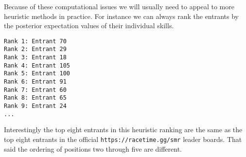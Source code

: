 \documentclass[
  letterpaper,
  DIV=11,
  numbers=noendperiod]{scrartcl}
\newenvironment{Shaded}{\begin{snugshade}}{\end{snugshade}}
\newcommand{\AttributeTok}[1]{\textcolor[rgb]{0.40,0.45,0.13}{#1}}
\newcommand{\ConstantTok}[1]{\textcolor[rgb]{0.56,0.35,0.01}{#1}}
\newcommand{\ControlFlowTok}[1]{\textcolor[rgb]{0.00,0.23,0.31}{#1}}
\newcommand{\DecValTok}[1]{\textcolor[rgb]{0.68,0.00,0.00}{#1}}
\newcommand{\FunctionTok}[1]{\textcolor[rgb]{0.28,0.35,0.67}{#1}}
\newcommand{\NormalTok}[1]{\textcolor[rgb]{0.00,0.23,0.31}{#1}}
\newcommand{\OtherTok}[1]{\textcolor[rgb]{0.00,0.23,0.31}{#1}}
\newcommand{\SpecialCharTok}[1]{\textcolor[rgb]{0.37,0.37,0.37}{#1}}
\newcommand{\StringTok}[1]{\textcolor[rgb]{0.13,0.47,0.30}{#1}}
\begin{document}
Because of these computational issues we will usually need to appeal to
more heuristic methods in practice. For instance we can always rank the
entrants by the posterior expectation values of their individual skills.

\begin{Shaded}
\end{Shaded}

\begin{verbatim}
Rank 1: Entrant 70
Rank 2: Entrant 29
Rank 3: Entrant 18
Rank 4: Entrant 105
Rank 5: Entrant 100
Rank 6: Entrant 91
Rank 7: Entrant 60
Rank 8: Entrant 65
Rank 9: Entrant 24
...
\end{verbatim}

Interestingly the top eight entrants in this heuristic ranking are the
same as the top eight entrants in the official
\texttt{https://racetime.gg/smr} leader boards. That said the ordering
of positions two through five are different.
\end{document}
